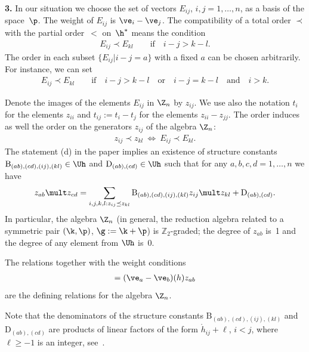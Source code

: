 \documentclass[11pt]{article}
\def\nplus{\mathfrak{n}}\def\nn{\nonumber}\def\nin{\noindent}
\def\s{z}\def\S{\mathrm {S}}\def\si{\sigma}\def\Sp{\S^{\nplus}}\def\sy{\acute{\sigma}}\def\th{\mathring{h}}
\newcommand{\ZZ}{{\mathbb Z}}\def\Hom{\operatorname{Hom}}\def\I{\mathrm{I}}
\numberwithin{equation}{section}
\begin{document}
{\bf 3.} In our situation we choose the set of vectors $E_{ij}$, $i,j=1,\dots ,n$, as a basis of the space~$\p$. The weight of $E_{ij}$ is $\ve_i-\ve_j$.
The compatibility of a total order $\prec$ with the partial order~$<$ on~$\h^*$ means the condition
\begin{gather*}%
E_{ij}\prec E_{kl}\qquad \text{if}\quad i-j>k-l .
\end{gather*}
The order in each subset $\{E_{ij}|i-j=a\}$ with a f\/ixed $a$ can be chosen arbitrarily. For instance, we can set
\begin{gather}\label{not4}
E_{ij}\prec E_{kl}\qquad \text{if}\quad i-j>k-l\quad\text{or}\quad i-j=k-l\quad\text{and}\quad i>k .
\end{gather}

Denote the images of the elements $E_{ij}$ in $\Z_n$ by $\s_{ij}$. We use also the notation $t_i$ for the elements $\s_{ii}$ and $t_{ij}:=t_i-t_j$ for the elements
$\s_{ii}-\s_{jj}$. The order  induces as well the order on the generators $\s_{ij}$ of the algebra $\Z_n$:
\begin{gather*} %
\s_{ij}\prec\s_{kl}\ \Leftrightarrow\ E_{ij}\prec E_{kl}  .
\end{gather*}
The  statement (d) in the paper \cite[Section~2]{KO3} implies an existence of structure constants $\mathrm{B}_{(ab),(cd),(ij),(kl)} \in \Uh$ and $\mathrm{D}_{(ab),(cd)}\in\Uh$
such that for any $a,b,c,d=1,\ldots,n$ we have
\begin{gather}\label{not6}
\s_{ab}\mult\s_{cd}=\sum_{i,j,k,l:\s_{ij}\preceq\s_{kl}}\mathrm{B}_{(ab),(cd),(ij),(kl)}\s_{ij}\mult\s_{kl}+\mathrm{D}_{(ab),(cd)}  .
\end{gather}
In particular, the algebra $\Z_n$ (in general, the reduction algebra related to a symmetric pair $(\k,\p)$, $\g :=\k +\p$) is $\ZZ_2$-graded; the degree of $\s_{ab}$ is~1 and the degree of any element from $\Uh$ is~0.


The relations  together with the weight conditions
\begin{gather*}
 [h,\s_{ab}]=(\ve_a-\ve_b)(h) \s_{ab}%
\end{gather*}
are the def\/ining relations for the algebra $\Z_n$.


Note that the denominators of the structure constants $\mathrm{B}_{(ab),(cd),(ij),(kl)}$ and
 $\mathrm{D}_{(ab),(cd)}$ are pro\-ducts
of linear factors of the form $\th_{ij}+\ell$, $i<j$, where $\ell\geq -1$ is an integer, see~\cite{KO3}.
\end{document}

